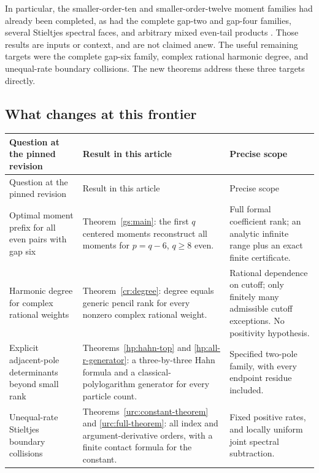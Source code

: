 \documentclass[11pt,a4paper]{article}
\theoremstyle{definition}
\theoremstyle{remark}
\numberwithin{equation}{section}
\begin{document}
In particular, the smaller-order-ten and smaller-order-twelve
moment families had already been completed, as had the complete
gap-two and gap-four families, several Stieltjes spectral faces,
and arbitrary mixed even-tail products
\cite{BilinearIncoming,TailKernelsIncoming,OrderedIncoming,LatticeIncoming}.
Those results are inputs or context, and are not claimed anew.
The useful remaining targets were the complete gap-six family,
complex rational harmonic degree, and unequal-rate boundary
collisions. The new theorems address these three targets directly.

\subsection{What changes at this frontier}

\begin{longtable}{@{}>{\raggedright\arraybackslash}p{}
 >{\raggedright\arraybackslash}p{}
 >{\raggedright\arraybackslash}p{}@{}}
\toprule
Question at the pinned revision & Result in this article & Precise scope\\
\midrule
\endfirsthead
\toprule
Question at the pinned revision & Result in this article & Precise scope\\
\midrule
\endhead
Optimal moment prefix for all even pairs with gap six &
Theorem~\ref{gs:main}: the first $q$ centered moments reconstruct
all moments for $p=q-6$, $q\ge8$ even. &
Full formal coefficient rank; an analytic infinite range plus an
exact finite certificate.\\[7pt]
Harmonic degree for complex rational weights &
Theorem~\ref{cr:degree}: degree equals generic pencil rank for
every nonzero complex rational weight. &
Rational dependence on cutoff; only finitely many admissible
cutoff exceptions. No positivity hypothesis.\\[7pt]
Explicit adjacent-pole determinants beyond small rank &
Theorems~\ref{hp:hahn-top} and \ref{hp:all-r-generator}: a
three-by-three Hahn formula and a classical-polylogarithm
generator for every particle count. &
Specified two-pole family, with every endpoint residue included.\\[7pt]
Unequal-rate Stieltjes boundary collisions &
Theorems~\ref{urc:constant-theorem} and \ref{urc:full-theorem}:
all index and argument-derivative orders, with a finite contact
formula for the constant. &
Fixed positive rates, and locally uniform joint spectral
subtraction.\\
\bottomrule
\end{longtable}
\end{document}
